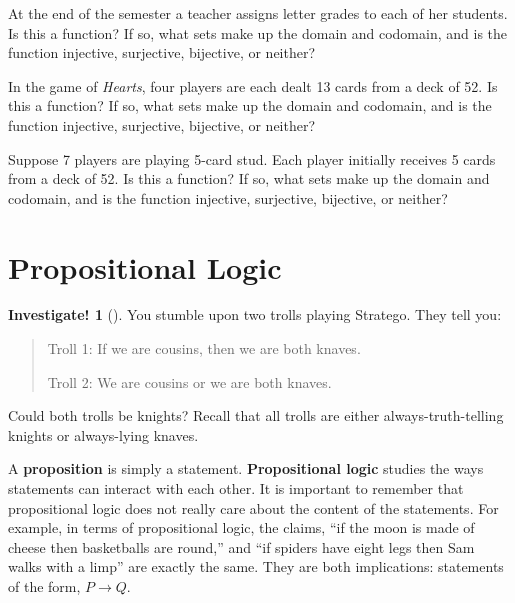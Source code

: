 \documentclass[10pt,]{book}
\newcommand{\terminology}[1]{\textbf{#1}}
\theoremstyle{plain}
\theoremstyle{definition}
\theoremstyle{definition}
\theoremstyle{definition}
\newtheorem{investigation}[project]{Investigate!}
\theoremstyle{definition}
\numberwithin{equation}{chapter}
\def\imp{\rightarrow}
\begin{document}
\begin{divisionexercise}{15}\hypertarget{exercise-217}{}
\hypertarget{p-1884}{}%
At the end of the semester a teacher assigns letter grades to each of her students. Is this a function? If so, what sets make up the domain and codomain, and is the function injective, surjective, bijective, or neither?%
\end{divisionexercise}%
\begin{divisionexercise}{16}\hypertarget{exercise-218}{}
\hypertarget{p-1886}{}%
In the game of \emph{Hearts}, four players are each dealt 13 cards from a deck of 52. Is this a function? If so, what sets make up the domain and codomain, and is the function injective, surjective, bijective, or neither?%
\end{divisionexercise}%
\begin{divisionexercise}{17}\hypertarget{exercise-219}{}
\hypertarget{p-1888}{}%
Suppose 7 players are playing 5-card stud. Each player initially receives 5 cards from a deck of 52. Is this a function? If so, what sets make up the domain and codomain, and is the function injective, surjective, bijective, or neither?%
\end{divisionexercise}%
\typeout{************************************************}
\typeout{************************************************}
\section[{Propositional Logic}]{Propositional Logic}\label{sec_propositional}
\begin{investigation}[]\label{investigation-13}
\hypertarget{p-1890}{}%
You stumble upon two trolls playing Stratego\textregistered{}.  They tell you:%
\begin{quote}\hypertarget{blockquote-9}{}
\hypertarget{p-1891}{}%
Troll 1: If we are cousins, then we are both knaves.%
\par
\hypertarget{p-1892}{}%
Troll 2: We are cousins or we are both knaves.%
\end{quote}
\hypertarget{p-1893}{}%
Could both trolls be knights?  Recall that all trolls are either always-truth-telling knights or always-lying knaves.%
\end{investigation}
\hypertarget{p-1894}{}%
A \terminology{proposition} is simply a statement. \terminology{Propositional logic} studies the ways statements can interact with each other. It is important to remember that propositional logic does not really care about the content of the statements. For example, in terms of propositional logic, the claims, ``if the moon is made of cheese then basketballs are round,'' and ``if spiders have eight legs then Sam walks with a limp'' are exactly the same. They are both implications: statements of the form, \(P \imp Q\).%
\typeout{************************************************}
\typeout{************************************************}
\end{document}
